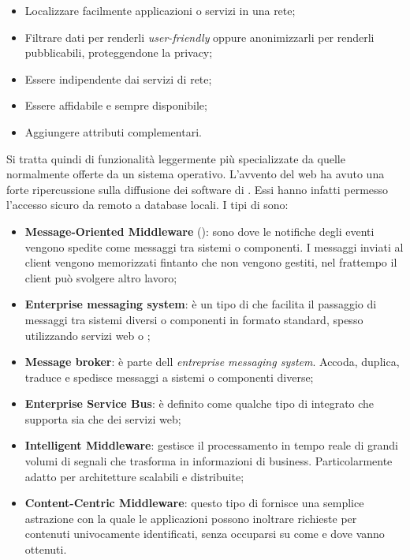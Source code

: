 \begin{itemize}

	\item Localizzare facilmente applicazioni o servizi in una rete;
	\item Filtrare dati per renderli \textit{user-friendly} oppure anonimizzarli per renderli pubblicabili, proteggendone la privacy;
	\item Essere indipendente dai servizi di rete;
	\item Essere affidabile e sempre disponibile;
	\item Aggiungere attributi complementari.
	
\end{itemize}
	
Si tratta quindi di funzionalità leggermente più specializzate da quelle normalmente offerte da un sistema operativo. L'avvento del web ha avuto una forte ripercussione sulla diffusione dei software di . Essi hanno infatti permesso l'accesso sicuro da remoto a database locali. I tipi di  sono:
	
\begin{itemize}
	
	\item \textbf{Message-Oriented Middleware} (): sono  dove le notifiche degli eventi vengono spedite come messaggi tra sistemi o componenti. I messaggi inviati al client vengono memorizzati fintanto che non vengono gestiti, nel frattempo il client può svolgere altro lavoro;
	\item \textbf{Enterprise messaging system}: è un tipo di  che facilita il passaggio di messaggi tra sistemi diversi o componenti in formato standard, spesso utilizzando servizi web o ;
	\item \textbf{Message broker}: è parte dell \emph{entreprise messaging system}. Accoda, duplica, traduce e spedisce messaggi a sistemi o componenti diverse;
	\item \textbf{Enterprise Service Bus}: è definito come qualche tipo di  integrato che supporta sia  che dei servizi web;
	\item \textbf{Intelligent Middleware}: gestisce il processamento in tempo reale di grandi volumi di segnali che trasforma in informazioni di business. Particolarmente adatto per architetture scalabili e distribuite;
	\item \textbf{Content-Centric Middleware}: questo tipo di  fornisce una semplice astrazione con la quale le applicazioni possono inoltrare richieste per contenuti univocamente identificati, senza occuparsi su come e dove vanno ottenuti.
		
\end{itemize}	 
	

